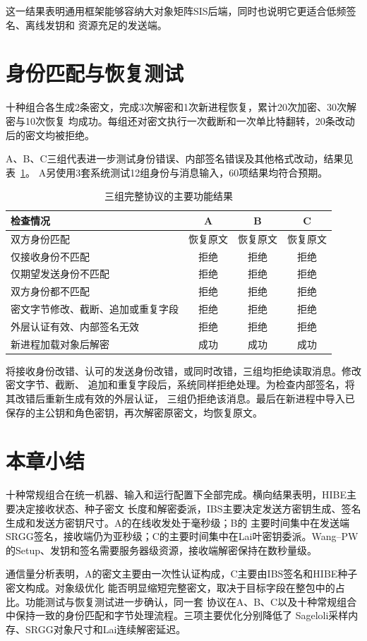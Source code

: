 这一结果表明通用框架能够容纳大对象矩阵SIS后端，同时也说明它更适合低频签名、离线发钥和
资源充足的发送端。

\section{身份匹配与恢复测试}
十种组合各生成2条密文，完成3次解密和1次新进程恢复，累计20次加密、30次解密与10次恢复
均成功。每组还对密文执行一次截断和一次单比特翻转，20条改动后的密文均被拒绝。

A、B、C三组代表进一步测试身份错误、内部签名错误及其他格式改动，结果见表~\ref{tab:functional}。
A另使用3套系统测试12组身份与消息输入，60项结果均符合预期。

\begin{table}[H]
\centering\small
\caption{三组完整协议的主要功能结果}
\label{tab:functional}
\begin{tabularx}{\textwidth}{@{}Xccc@{}}
\toprule
\rowcolor{black!8} 检查情况 & A & B & C \\
\midrule
双方身份匹配 & 恢复原文 & 恢复原文 & 恢复原文 \\
仅接收身份不匹配 & 拒绝 & 拒绝 & 拒绝 \\
仅期望发送身份不匹配 & 拒绝 & 拒绝 & 拒绝 \\
双方身份都不匹配 & 拒绝 & 拒绝 & 拒绝 \\
密文字节修改、截断、追加或重复字段 & 拒绝 & 拒绝 & 拒绝 \\
外层认证有效、内部签名无效 & 拒绝 & 拒绝 & 拒绝 \\
新进程加载对象后解密 & 成功 & 成功 & 成功 \\
\bottomrule
\end{tabularx}
\end{table}

将接收身份改错、认可的发送身份改错，或同时改错，三组均拒绝读取消息。修改密文字节、截断、
追加和重复字段后，系统同样拒绝处理。为检查内部签名，将其改错后重新生成有效的外层认证，
三组仍拒绝该消息。最后在新进程中导入已保存的主公钥和角色密钥，再次解密原密文，均恢复原文。

\section{本章小结}

十种常规组合在统一机器、输入和运行配置下全部完成。横向结果表明，HIBE主要决定接收状态、种子密文
长度和解密委派，IBS主要决定发送方密钥生成、签名生成和发送方密钥尺寸。A的在线收发处于毫秒级；B的
主要时间集中在发送端SRGG签名，接收端仍为亚秒级；C的主要时间集中在Lai叶密钥委派。Wang--PW
的Setup、发钥和签名需要服务器级资源，接收端解密保持在数秒量级。

通信量分析表明，A的密文主要由一次性认证构成，C主要由IBS签名和HIBE种子密文构成。对象级优化
能否明显缩短完整密文，取决于目标字段在整包中的占比。功能测试与恢复测试进一步确认，同一套
协议在A、B、C以及十种常规组合中保持一致的身份匹配和字节处理流程。三项主要优化分别降低了
Sageloli采样内存、SRGG对象尺寸和Lai连续解密延迟。

